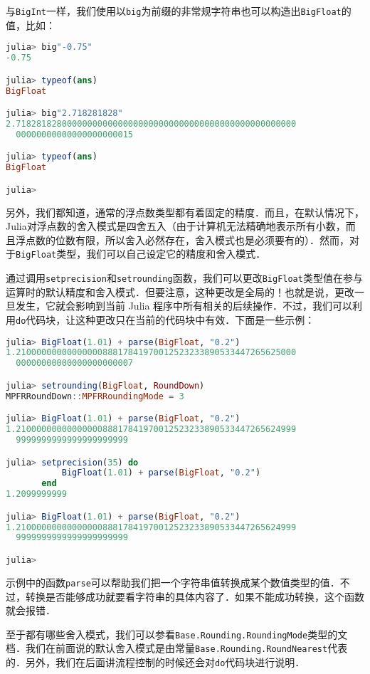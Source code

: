 与\verb|BigInt|一样，我们使用以\verb|big|为前缀的非常规字符串也可以构造出\verb|BigFloat|的值，比如：
\begin{lstlisting}[language=julia]
julia> big"-0.75"
-0.75

julia> typeof(ans)
BigFloat

julia> big"2.718281828"
2.7182818280000000000000000000000000000000000000000000000
  00000000000000000000015

julia> typeof(ans)
BigFloat

julia> 
\end{lstlisting}

另外，我们都知道，通常的浮点数类型都有着固定的精度．而且，在默认情况下，Julia对浮点数的舍入模式是四舍五入（由于计算机无法精确地表示所有小数，而且浮点数的位数有限，所以舍入必然存在，舍入模式也是必须要有的）．然而，对于\verb|BigFloat|类型，我们可以自己设定它的精度和舍入模式．

通过调用\verb|setprecision|和\verb|setrounding|函数，我们可以更改\verb|BigFloat|类型值在参与运算时的默认精度和舍入模式．但要注意，这种更改是全局的！也就是说，更改一旦发生，它就会影响到当前 Julia 程序中所有相关的后续操作．不过，我们可以利用\verb|do|代码块，让这种更改只在当前的代码块中有效．下面是一些示例：
\begin{lstlisting}[language=julia]
julia> BigFloat(1.01) + parse(BigFloat, "0.2")
1.2100000000000000088817841970012523233890533447265625000
  00000000000000000000007

julia> setrounding(BigFloat, RoundDown)
MPFRRoundDown::MPFRRoundingMode = 3

julia> BigFloat(1.01) + parse(BigFloat, "0.2")
1.2100000000000000088817841970012523233890533447265624999
  9999999999999999999999

julia> setprecision(35) do 
           BigFloat(1.01) + parse(BigFloat, "0.2") 
       end
1.2099999999

julia> BigFloat(1.01) + parse(BigFloat, "0.2") 
1.2100000000000000088817841970012523233890533447265624999
  9999999999999999999999

julia> 
\end{lstlisting}

示例中的函数\verb|parse|可以帮助我们把一个字符串值转换成某个数值类型的值．不过，转换是否能够成功就要看字符串的具体内容了．如果不能成功转换，这个函数就会报错．

至于都有哪些舍入模式，我们可以参看\verb|Base.Rounding.RoundingMode|类型的文档．我们在前面说的默认舍入模式是由常量\verb|Base.Rounding.RoundNearest|代表的．另外，我们在后面讲流程控制的时候还会对\verb|do|代码块进行说明．
